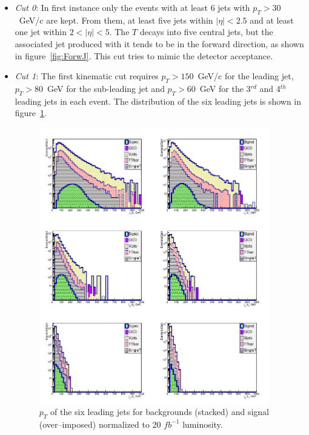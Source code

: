 \begin{itemize}

\item \textit{Cut 0}: In first instance only the events with at least 6 jets with $p_T > 30$~GeV/c are kept. From them, at least five jets within $|\eta|<2.5$ and at least one jet within $2<|\eta|<5$. The $T$ decays into five central jets, but the associated jet produced with it tends to be in the forward direction, as shown in figure~\ref{fig:ForwJ}. This cut tries to mimic the detector acceptance.

\item \textit{Cut 1}: The first kinematic cut requires $p_{T}>150$~GeV/c for the leading jet, $p_{T}>80$~GeV for the sub-leading jet and $p_{T}>60$~GeV for the 3$^{rd}$ and 4$^{th}$ leading jets in each event. The \pt distribution of the six leading jets is shown in figure~\ref{fig:Var1}.

\begin{figure}[!Hhtbp]
  \begin{center}
    \includegraphics[width=0.95\textwidth]{figs/Pheno/JetPt.png}
    \caption{$p_{T}$  of the six leading jets for backgrounds (stacked) and signal (over--imposed) normalized to 20 $fb^{-1}$ luminosity.}
    \label{fig:Var1}
  \end{center}
\end{figure}


\end{itemize}
